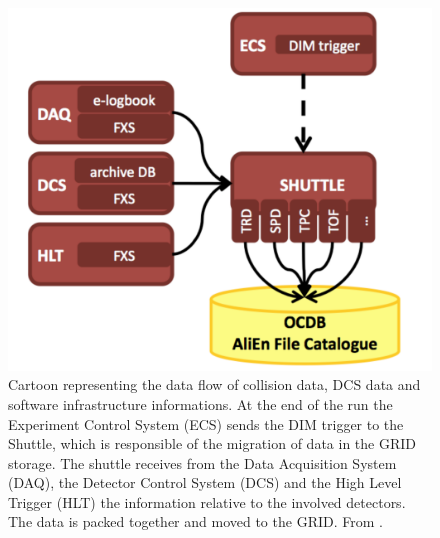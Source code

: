 \begin{figure}[!t]
\begin{center}
\includegraphics[width=0.7\linewidth]{Chapters/Performance/Figs/OCDB.pdf}
\caption{Cartoon representing the data flow of collision data, DCS data and software infrastructure informations. At the end of the run the Experiment Control System (ECS) sends the DIM trigger to the Shuttle, which is responsible of the migration of data in the GRID storage. The shuttle receives from the Data Acquisition System (DAQ), the Detector Control System (DCS) and the High Level Trigger (HLT) the information relative to the involved detectors. The data is packed together and moved to the GRID. From \cite{Zampolli:2010zz}.}
\label{fig:shuttle}
\end{center}
\end{figure}

